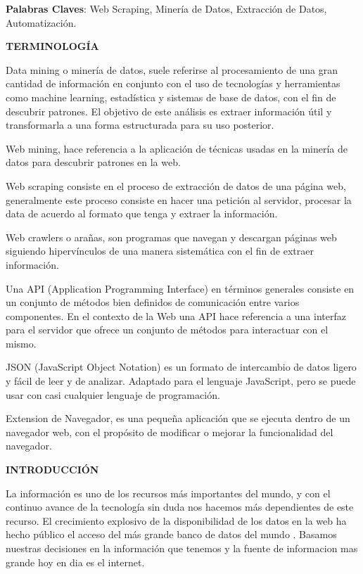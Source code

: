 \documentclass[12pt]{report}
\begin{document}
\vfill
\noindent
\textbf{Palabras Claves}: Web Scraping, Minería de Datos, Extracción de Datos, Automatización.

\break


\noindent
\textbf{TERMINOLOGÍA}
{}

Data mining o minería de datos, suele referirse al procesamiento de una gran cantidad de información en conjunto con el uso de tecnologías y herramientas como machine learning, estadística y sistemas de base de datos, con el fin de descubrir patrones. El objetivo de este análisis es extraer información útil y transformarla a una forma estructurada para su uso posterior.

Web mining, hace referencia a la aplicación de técnicas usadas en la minería de datos para descubrir patrones en la web.

Web scraping consiste en el proceso de extracción de datos de una página web, generalmente este proceso consiste en hacer una petición al servidor, procesar la data de acuerdo al formato que tenga y extraer la información.

Web crawlers o arañas, son programas que navegan y descargan páginas web siguiendo hipervínculos de una manera sistemática con el fin de extraer información.

Una API (Application Programming Interface) en términos generales consiste en un conjunto de métodos bien definidos de comunicación entre varios componentes. En el contexto de la Web una API hace referencia a una interfaz para el servidor que ofrece un conjunto de métodos para interactuar con el mismo.

JSON (JavaScript Object Notation) es un formato de intercambio de datos ligero y fácil de leer y de analizar. Adaptado para el lenguaje JavaScript, pero se puede usar con casi cualquier lenguaje de programación. 

Extension de Navegador, es una pequeña aplicación que se ejecuta dentro de un navegador web, con el propósito de modificar o mejorar la funcionalidad del navegador.

\break


\noindent
\textbf{INTRODUCCIÓN}
{}

La información es uno de los recursos más importantes del mundo, y con el continuo avance de la tecnología sin duda nos hacemos más dependientes de este recurso. El crecimiento explosivo de la disponibilidad de los datos en la web ha hecho público el acceso del más grande banco de datos del mundo \cite{khalil2017rcrawler}. Basamos nuestras decisiones en la información que tenemos y la fuente de informacion mas grande hoy en dia es el internet.
\end{document}
